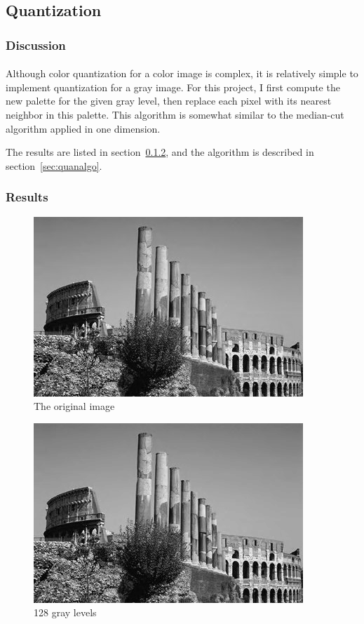 \documentclass{article}
\begin{document}
\subsection{Quantization}

\subsubsection{Discussion}

\paragraph{}
Although color quantization for a color image is complex, it is relatively simple to implement quantization for a gray image. For this project, I first compute the new palette for the given gray level, then replace each pixel with its nearest neighbor in this palette. This algorithm is somewhat similar to the median-cut algorithm applied in one dimension.

The results are listed in section~\ref{sec:quanresult}, and the algorithm is described in section~\ref{sec:quanalgo}.

\subsubsection{Results}
\label{sec:quanresult}
\begin{figure}[H]
\centering
\includegraphics[width=288pt]{../img/02.png}
\caption{The original image}
\label{quanorigin}
\end{figure}

\begin{figure}[H]
\centering
\includegraphics[width=288pt]{../result/quantize-128.png}
\caption{128 gray levels}
\label{quan128}
\end{figure}
\end{document}
